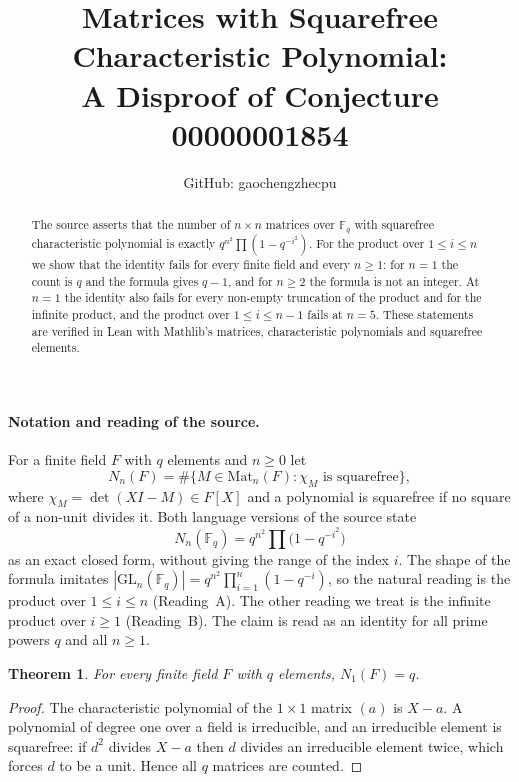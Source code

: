 \documentclass[11pt]{article}
\title{Matrices with Squarefree Characteristic Polynomial:\\A Disproof of Conjecture 00000001854}
\author{GitHub: gaochengzhecpu}
\date{}
\newtheorem{theorem}{Theorem}
\theoremstyle{remark}
\newcommand{\F}{\mathbb F}
\begin{document}
\maketitle
\begin{abstract}
The source asserts that the number of $n\times n$ matrices over $\F_q$
with squarefree characteristic polynomial is exactly
$q^{n^2}\prod(1-q^{-i^2})$. For the product over $1\le i\le n$ we show
that the identity fails for every finite field and every $n\ge1$: for
$n=1$ the count is $q$ and the formula gives $q-1$, and for $n\ge2$ the
formula is not an integer. At $n=1$ the identity also fails for every
non-empty truncation of the product and for the infinite product, and
the product over $1\le i\le n-1$ fails at $n=5$. These
statements are verified in Lean with Mathlib's matrices, characteristic
polynomials and squarefree elements.
\end{abstract}

\paragraph{Notation and reading of the source.}
For a finite field $F$ with $q$ elements and $n\ge0$ let
\[
 N_n(F)=\#\{M\in \mathrm{Mat}_n(F): \chi_M \text{ is squarefree}\},
\]
where $\chi_M=\det(XI-M)\in F[X]$ and a polynomial is squarefree if no
square of a non-unit divides it. Both language versions of the source
state
\[
 N_n(\F_q)=q^{n^2}\prod\bigl(1-q^{-i^2}\bigr)
\]
as an exact closed form, without giving the range of the index $i$. The
shape of the formula imitates $|\mathrm{GL}_n(\F_q)|=q^{n^2}\prod_{i=1}^n
(1-q^{-i})$, so the natural reading is the product over $1\le i\le n$
(Reading~A). The other reading we treat is the infinite product over
$i\ge1$ (Reading~B). The claim is read as an identity for all prime
powers $q$ and all $n\ge1$.

\begin{theorem}\label{thm:one}
For every finite field $F$ with $q$ elements, $N_1(F)=q$.
\end{theorem}
\begin{proof}
The characteristic polynomial of the $1\times1$ matrix $(a)$ is $X-a$.
A polynomial of degree one over a field is irreducible, and an
irreducible element is squarefree: if $d^2$ divides $X-a$ then $d$
divides an irreducible element twice, which forces $d$ to be a unit.
Hence all $q$ matrices are counted.
\end{proof}
\end{document}
